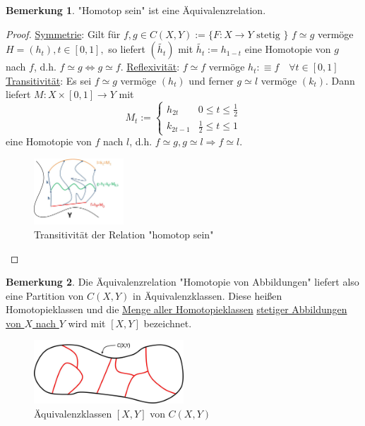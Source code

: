 \documentclass[a4paper,11pt,notitlepage]{report}
\theoremstyle{definition}
\newtheorem{remark}{Bemerkung}[chapter]
\begin{document}
\begin{remark}
"Homotop sein" ist eine Äquivalenzrelation.
\end{remark}

\begin{proof}
	\underline{Symmetrie}:
	Gilt für $f,g \in C(X,Y) := \{F \colon X \rightarrow Y \text{ stetig } \}$ $f \simeq g$ vermöge $H=(h_t), t \in [0,1],$ so liefert $(\tilde{h_t})$ mit $\tilde{h_t}:=h_{1-t}$ eine Homotopie von $g$ nach $f$, d.h. $f \simeq g \Leftrightarrow g \simeq f$.
	\newline
	\underline{Reflexivität}:
	$f \simeq f$ vermöge $h_t : \equiv f \quad \forall t \in [0,1]$
	\newline
	\underline{Transitivität}:
	Es sei $f \simeq g$ vermöge $(h_t)$ und ferner $g \simeq l$ vermöge $(k_t)$.
	Dann liefert $M \colon X \times [0,1] \rightarrow Y$ mit
	$$M_t := \begin{cases} h_{2t} & 0 \leq t \leq \frac{1}{2} \\
	k_{2t-1} & \frac{1}{2} \leq t \leq 1
	\end{cases}$$
	eine Homotopie von $f$ nach $l$, d.h. $f \simeq g, g \simeq l \Rightarrow f \simeq l$.
	\begin{figure}[!h]
\centering
\includegraphics[width=0.3\textwidth]{images/Homotopie_Transitivitaet.jpg}
\caption{Transitivität der Relation "homotop sein"}
\end{figure}
\end{proof}

\begin{remark}
Die Äquivalenzrelation "Homotopie von Abbildungen" liefert also eine Partition von $C(X,Y)$ in Äquivalenzklassen. Diese heißen Homotopieklassen und die \underline{Menge aller Homotopieklassen} \underline{stetiger Abbildungen} \underline{von $X$ nach $Y$} wird mit $[X,Y]$ bezeichnet.
\begin{figure}[h]
\centering
\includegraphics[width=0.5\textwidth]{images/Aequivalenzklassen.jpg}
\caption{Äquivalenzklassen $[X,Y]$ von $C(X,Y)$}
\end{figure}
\end{remark}
\end{document}
